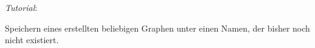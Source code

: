 \emph{Tutorial}:

Speichern eines erstellten beliebigen Graphen unter einen Namen, der bisher
noch nicht existiert.

